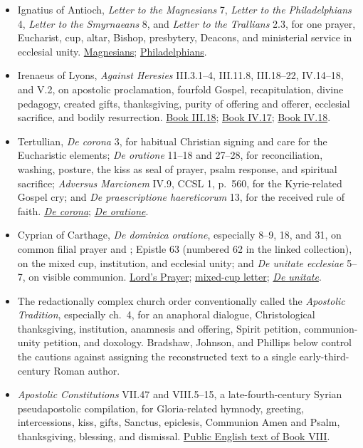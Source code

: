\begin{itemize}
  \item Ignatius of Antioch, \emph{Letter to the Magnesians} 7, \emph{Letter to the Philadelphians} 4, \emph{Letter to the Smyrnaeans} 8, and \emph{Letter to the Trallians} 2.3, for one prayer, Eucharist, cup, altar, Bishop, presbytery, Deacons, and ministerial service in ecclesial unity. \href{https://www.newadvent.org/fathers/0105.htm}{Magnesians}; \href{https://www.newadvent.org/fathers/0108.htm}{Philadelphians}.
  \item Irenaeus of Lyons, \emph{Against Heresies} III.3.1--4, III.11.8, III.18--22, IV.14--18, and V.2, on apostolic proclamation, fourfold Gospel, recapitulation, divine pedagogy, created gifts, thanksgiving, purity of offering and offerer, ecclesial sacrifice, and bodily resurrection. \href{https://www.newadvent.org/fathers/0103318.htm}{Book III.18}; \href{https://www.newadvent.org/fathers/0103417.htm}{Book IV.17}; \href{https://www.newadvent.org/fathers/0103418.htm}{Book IV.18}.
  \item Tertullian, \emph{De corona} 3, for habitual Christian signing and care for the Eucharistic elements; \emph{De oratione} 11--18 and 27--28, for reconciliation, washing, posture, the kiss as seal of prayer, psalm response, and spiritual sacrifice; \emph{Adversus Marcionem} IV.9, CCSL 1, p.~560, for the Kyrie-related Gospel cry; and \emph{De praescriptione haereticorum} 13, for the received rule of faith. \href{https://www.newadvent.org/fathers/0304.htm}{\emph{De corona}}; \href{https://www.newadvent.org/fathers/0322.htm}{\emph{De oratione}}.
  \item Cyprian of Carthage, \emph{De dominica oratione}, especially 8--9, 18, and 31, on common filial prayer and ; Epistle 63 (numbered 62 in the linked collection), on the mixed cup, institution, and ecclesial unity; and \emph{De unitate ecclesiae} 5--7, on visible communion. \href{https://www.newadvent.org/fathers/050704.htm}{Lord's Prayer}; \href{https://www.newadvent.org/fathers/050662.htm}{mixed-cup letter}; \href{https://www.newadvent.org/fathers/050701.htm}{\emph{De unitate}}.
  \item The redactionally complex church order conventionally called the \emph{Apostolic Tradition}, especially ch.~4, for an anaphoral dialogue, Christological thanksgiving, institution, anamnesis and offering, Spirit petition, communion-unity petition, and doxology. Bradshaw, Johnson, and Phillips below control the cautions against assigning the reconstructed text to a single early-third-century Roman author.
  \item \emph{Apostolic Constitutions} VII.47 and VIII.5--15, a late-fourth-century Syrian pseudapostolic compilation, for Gloria-related hymnody, greeting, intercessions, kiss, gifts, Sanctus, epiclesis, Communion Amen and Psalm, thanksgiving, blessing, and dismissal. \href{https://www.newadvent.org/fathers/07158.htm}{Public English text of Book VIII}.

\end{itemize}
